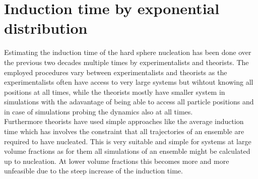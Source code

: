 


\section{Induction time by exponential distribution}
\label{sec:induction_times}
Estimating the induction time of the hard sphere nucleation has been done over the previous two decades multiple times by experimentalists and theorists. The employed procedures vary  between experimentalists and theorists as the experimentalists often have access to very large systems but wihtout knowing all positions at all times, while the theorists mostly have smaller system in simulations with the adavantage of being able to access all particle positions and in case of simulations probing the dynamics also at all times.\\

Furthermore theorists have used simple approaches like the average induction time which has involves the constraint that all trajectories of an ensemble are required to have nucleated. This is very suitable and simple for systems at large volume fractions as for them all simulations of an ensemble might be calculated up to nucleation. At lower volume fractions this becomes more and more unfeasible due to the steep increase of the induction time.\\

